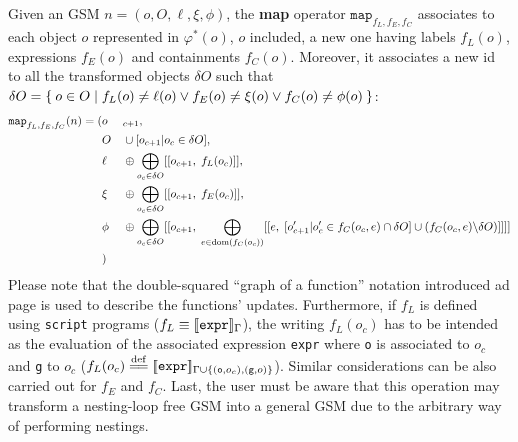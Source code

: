 \begin{definition}[Map]\label{gsql:map}
	Given an GSM $n=(o,O,\ell,\xi,\phi)$, the \textbf{map} operator $\texttt{map}_{f_L,f_E,f_C}$ associates to each object $o$ represented in $\varphi^*(o)$, $o$ included, a new one having labels $f_L(o)$, expressions $f_E(o)$ and containments $f_C(o)$. Moreover, it associates a new id to all the transformed objects $\delta O$ such that $\delta O=\Set{o\in O|f_L(o)\neq \ell(o)\vee f_E(o)\neq \xi(o)\vee f_C(o)\neq \phi(o)}$:
	\begin{alignat*}{3}
	\texttt{map}_{f_L,f_E,f_C}(n)=(&o &&{}_{c+1},\\
	&O&&\cup[o {}_{c+1}|o_c\in \delta O],\\
	&\ell&&\oplus \bigoplus_{o_c\in \delta O} [[o_{c+1},\; f_L(o_c)]],\\
	&\xi&&\oplus \bigoplus_{o_c\in \delta O} [[o_{c+1},\;  f_E(o_c)]],\\
	&\phi&&\oplus \bigoplus_{\substack{o_c\in \delta O}}  [[o_{c+1},\; \bigoplus_{e\in\operatorname{dom}(f_C(o_c))} [[e,\; [o'_{c+1}|o'_c\in f_C(o_c,e)\cap\delta O]\cup(f_C(o_c,e)\backslash \delta O)]]]] \\
	&)\\
	\end{alignat*}
	Please note that the double-squared ``graph of a function'' notation introduced ad page \pageref{def:doublesquarednotation} is used to describe the functions' updates. Furthermore, if $f_L$ is defined using \texttt{script} programs ($f_L\equiv[\! [\texttt{expr}]\!]_\Gamma$), the writing $f_L(o_c)$ has to be intended as the evaluation of the associated expression \texttt{expr} where \texttt{o} is associated to $o_c$ and \texttt{g} to $o_c$ ($f_L(o_c)\overset{\mathrm{def}}{=\mathrel{\mkern-3mu}=} [\! [\texttt{expr}]\!]_{\Gamma\cup\{(\texttt{o},o_c),(\texttt{g},o)\}}$). Similar considerations can be also carried out for $f_E$ and $f_C$. Last, the user must be aware that this operation may transform a nesting-loop free GSM into a general GSM due to the arbitrary way of performing nestings.
\end{definition}
